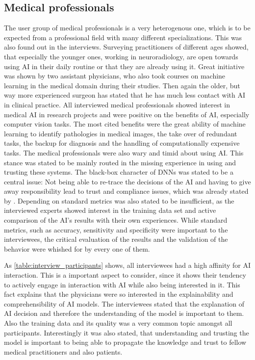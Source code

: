 \documentclass[11pt,a4paper,english]{scrreprt}
\begin{document}
\subsection{Medical professionals}
The user group of medical professionals is a very heterogenous one, which is to be expected from a professional field with many different specializations. This was also found out in the interviews. Surveying practitioners of different ages showed, that especially the younger ones, working in neuroradiology, are open towards using AI in their daily routine or that they are already using it. Great initiative was shown by two assistant physicians, who also took courses on machine learning in the medical domain during their studies. Then again the older, but way more experienced surgeon has stated that he has much less contact with AI in clinical practice. All interviewed medical professionals showed interest in medical AI in research projects and were positive on the benefits of AI, especially computer vision tasks. The most cited benefits were the great ability of machine learning to identify pathologies in medical images, the take over of redundant tasks, the backup for diagnosis and the handling of computationally expensive tasks. The medical professionals were also wary and timid about using AI. This stance was stated to be mainly routed in the missing experience in using and trusting these systems. The black-box character of DNNs was stated to be a central issue: Not being able to re-trace the decisions of the AI and having to give away responsibility lead to trust and compliance issues, which was already stated by \textcite{ras_explainable_2021}. Depending on standard metrics was also stated to be insufficient, as the interviewed experts showed interest in the training data set and active comparison of the AI's results with their own experiences. While standard metrics, such as accuracy, sensitivity and specificity were important to the interviewees, the critical evaluation of the results and the validation of the behavior were whished for by every one of them.

As \autoref{table:interview_participants} shows, all interviewees had a high affinity for AI interaction. This is a important aspect to consider, since it shows their tendency to actively engage in interaction with AI while also being interested in it. This fact explains that the physicians were so interested in the explainability and comprehensibility of AI models. The interviewees stated that the explanation of AI decision and therefore the understanding of the model is important to them. Also the training data and its quality was a very common topic amongst all participants. Interestingly it was also stated, that understanding and trusting the model is important to being able to propagate the knowledge and trust to fellow medical practitioners and also patients.
\end{document}
